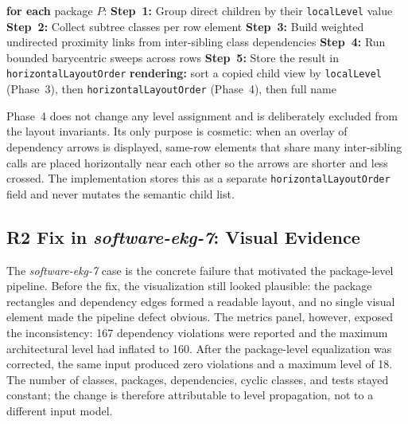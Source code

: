 \documentclass[a4paper,twoside]{article}
\begin{document}
\vspace{1em}
\begin{algorithm}[H]
\DontPrintSemicolon
\caption{Phase~4 -- Horizontal Row Ordering (\texttt{HorizontalRowLayoutOptimizer})}
\textbf{for each} package $P$:\;
\Indp
  \textbf{Step~1:} Group direct children by their \texttt{localLevel} value\;
  \textbf{Step~2:} Collect subtree classes per row element\;
  \textbf{Step~3:} Build weighted undirected proximity links from inter-sibling class dependencies\;
  \textbf{Step~4:} Run bounded barycentric sweeps across rows\;
  \textbf{Step~5:} Store the result in \texttt{horizontalLayoutOrder}\;
\Indm
\textbf{rendering:} sort a copied child view by \texttt{localLevel} (Phase~3), then \texttt{horizontalLayoutOrder} (Phase~4), then full name\;
\end{algorithm}

Phase~4 does not change any level assignment and is deliberately
excluded from the layout invariants. Its only purpose is cosmetic: when an
overlay of dependency arrows is displayed, same-row elements that share many
inter-sibling calls are placed horizontally near each other so the arrows are
shorter and less crossed. The implementation stores this as a separate
\texttt{horizontalLayoutOrder} field and never mutates the semantic child list.

\subsection*{R2 Fix in \emph{software-ekg-7}: Visual Evidence}

The \emph{software-ekg-7} case is the concrete failure that motivated the
package-level pipeline. Before the fix, the visualization still looked plausible:
the package rectangles and dependency edges formed a readable layout, and no
single visual element made the pipeline defect obvious. The metrics panel,
however, exposed the inconsistency: 167 dependency violations were reported and
the maximum architectural level had inflated to 160. After the package-level
equalization was corrected, the same input produced zero violations and a
maximum level of 18.
The number of classes, packages, dependencies, cyclic classes, and tests stayed
constant; the change is therefore attributable to level propagation, not to a
different input model.
\end{document}
